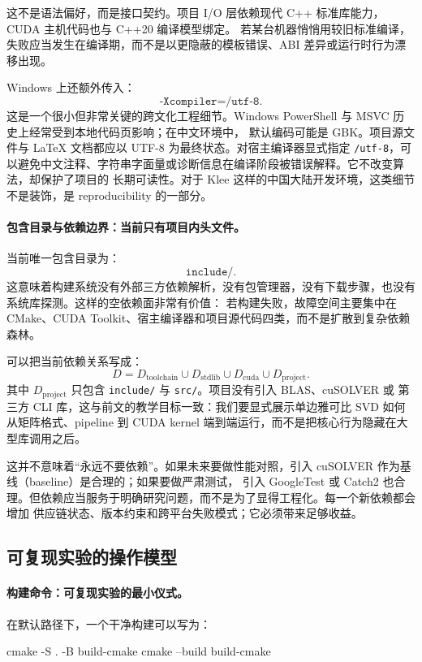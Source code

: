 这不是语法偏好，而是接口契约。项目 I/O 层依赖现代 C++ 标准库能力，CUDA 主机代码也与 C++20 编译模型绑定。
若某台机器悄悄用较旧标准编译，失败应当发生在编译期，而不是以更隐蔽的模板错误、ABI 差异或运行时行为漂移出现。

Windows 上还额外传入：
\[
    \texttt{-Xcompiler=/utf-8}.
\]
这是一个很小但非常关键的跨文化工程细节。Windows PowerShell 与 MSVC 历史上经常受到本地代码页影响；在中文环境中，
默认编码可能是 GBK。项目源文件与 LaTeX 文档都应以 UTF-8 为最终状态。对宿主编译器显式指定
\texttt{/utf-8}，可以避免中文注释、字符串字面量或诊断信息在编译阶段被错误解释。它不改变算法，却保护了项目的
长期可读性。对于 Klee 这样的中国大陆开发环境，这类细节不是装饰，是 reproducibility 的一部分。

\paragraph{包含目录与依赖边界：当前只有项目内头文件。}

当前唯一包含目录为：
\[
    \texttt{include/}.
\]
这意味着构建系统没有外部三方依赖解析，没有包管理器，没有下载步骤，也没有系统库探测。这样的空依赖面非常有价值：
若构建失败，故障空间主要集中在 CMake、CUDA Toolkit、宿主编译器和项目源代码四类，而不是扩散到复杂依赖森林。

可以把当前依赖关系写成：
\[
    D =
    D_{\mathrm{toolchain}}
    \cup
    D_{\mathrm{stdlib}}
    \cup
    D_{\mathrm{cuda}}
    \cup
    D_{\mathrm{project}}.
\]
其中 \(D_{\mathrm{project}}\) 只包含 \texttt{include/} 与 \texttt{src/}。项目没有引入 BLAS、cuSOLVER 或
第三方 CLI 库，这与前文的教学目标一致：我们要显式展示单边雅可比 SVD 如何从矩阵格式、pipeline 到 CUDA kernel
端到端运行，而不是把核心行为隐藏在大型库调用之后。

这并不意味着“永远不要依赖”。如果未来要做性能对照，引入 cuSOLVER 作为基线（baseline）是合理的；如果要做严肃测试，
引入 GoogleTest 或 Catch2 也合理。但依赖应当服务于明确研究问题，而不是为了显得工程化。每一个新依赖都会增加
供应链状态、版本约束和跨平台失败模式；它必须带来足够收益。

\subsection{可复现实验的操作模型}

\paragraph{构建命令：可复现实验的最小仪式。}

在默认路径下，一个干净构建可以写为：
\begin{bashlisting}
    cmake -S . -B build-cmake
    cmake --build build-cmake
\end{bashlisting}

